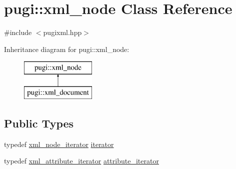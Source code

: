 \hypertarget{classpugi_1_1xml__node}{\section{pugi\-:\-:xml\-\_\-node Class Reference}
\label{classpugi_1_1xml__node}
}


{\ttfamily \#include $<$pugixml.\-hpp$>$}

Inheritance diagram for pugi\-:\-:xml\-\_\-node\-:\begin{figure}[H]
\begin{center}
\leavevmode
\includegraphics[height=2.000000cm]{classpugi_1_1xml__node}
\end{center}
\end{figure}
\subsection*{Public Types}
\begin{DoxyCompactItemize}
\item 
typedef \hyperlink{classpugi_1_1xml__node__iterator}{xml\-\_\-node\-\_\-iterator} \hyperlink{classpugi_1_1xml__node_ae053ea39add5a64de584f7a81212e388}{iterator}
\item 
typedef \hyperlink{classpugi_1_1xml__attribute__iterator}{xml\-\_\-attribute\-\_\-iterator} \hyperlink{classpugi_1_1xml__node_a9084f97350ffc64af1eaf7c17c57f4ba}{attribute\-\_\-iterator}
\end{DoxyCompactItemize}

